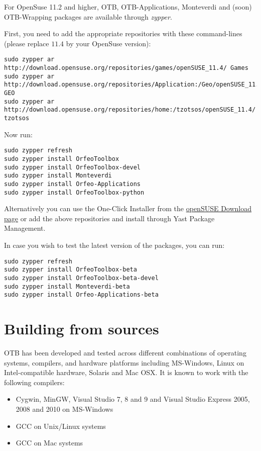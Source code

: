 For OpenSuse 11.2 and higher, OTB, OTB-Applications, Monteverdi and (soon)
OTB-Wrapping packages are available through \emph{zypper}.

First, you need to add the appropriate repositories with these command-lines (please replace $11.4$ by your OpenSuse version):
\begin{verbatim}
sudo zypper ar 
http://download.opensuse.org/repositories/games/openSUSE_11.4/ Games
sudo zypper ar 
http://download.opensuse.org/repositories/Application:/Geo/openSUSE_11.4/ GEO
sudo zypper ar 
http://download.opensuse.org/repositories/home:/tzotsos/openSUSE_11.4/ tzotsos
\end{verbatim}

Now run:
\begin{verbatim}
sudo zypper refresh
sudo zypper install OrfeoToolbox
sudo zypper install OrfeoToolbox-devel
sudo zypper install Monteverdi
sudo zypper install Orfeo-Applications
sudo zypper install OrfeoToolbox-python
\end{verbatim}

Alternatively you can use the One-Click Installer from the \href{http://software.opensuse.org/search?q=Orfeo&baseproject=openSUSE\%3A11.4&lang=en&include_home=true&exclude_debug=true}{openSUSE Download page} or add the above repositories and install through Yast Package Management.

In case you wish to test the latest version of the packages, you can run:
\begin{verbatim}
sudo zypper refresh
sudo zypper install OrfeoToolbox-beta
sudo zypper install OrfeoToolbox-beta-devel
sudo zypper install Monteverdi-beta
sudo zypper install Orfeo-Applications-beta
\end{verbatim}

\section{Building from sources}
\label{sec:source}
OTB has been developed and tested across different combinations of
operating systems, compilers, and hardware platforms including
MS-Windows, Linux on Intel-compatible hardware, Solaris and Mac
OSX.  It is known to work with the following compilers:
\begin{itemize}
\item Cygwin, MinGW, Visual Studio 7, 8 and 9 and Visual Studio Express 2005, 
  2008 and 2010 on MS-Windows%
\item GCC on Unix/Linux systems
\item GCC on Mac systems
\end{itemize}

